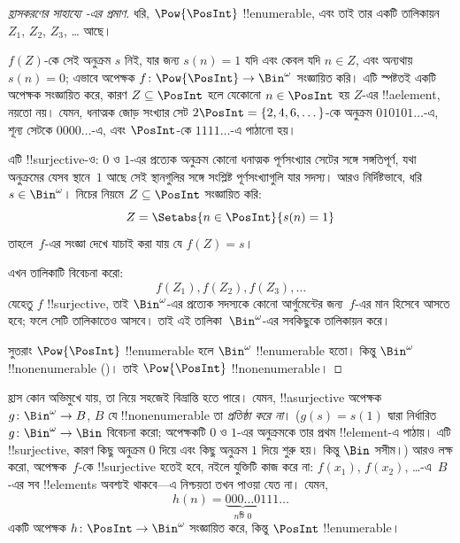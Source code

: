\documentclass[../../../include/open-logic-section]{subfiles}
\begin{document}
\begin{proof}[হ্রাসকরণের সাহায্যে {}-এর প্রমাণ]
ধরি, $\Pow{\PosInt}$ !!{enumerable}, এবং তাই তার একটি তালিকায়ন $Z_{1}$, $Z_{2}$, $Z_{3}$, \dots{} আছে।

$f(Z)$-কে সেই অনুক্রম $s$ নিই, যার জন্য $s(n) = 1$ যদি এবং কেবল যদি $n \in Z$, এবং অন্যথায় $s(n) = 0$; এভাবে অপেক্ষক $f \colon \Pow{\PosInt} \to \Bin^\omega$ সংজ্ঞায়িত করি। 
এটি স্পষ্টতই একটি অপেক্ষক সংজ্ঞায়িত করে, কারণ $Z \subseteq \PosInt$ হলে যেকোনো $n \in \PosInt$ হয় $Z$-এর !!a{element}, নয়তো নয়। যেমন, ধনাত্মক জোড় সংখ্যার সেট $2\PosInt = \{2,
4, 6, \dots\}$-কে অনুক্রম $010101\dots$-এ, শূন্য সেটকে $0000\dots$-এ, এবং $\PosInt$-কে $1111\dots$-এ পাঠানো হয়।

এটি !!{surjective}-ও: $0$ ও $1$-এর প্রত্যেক অনুক্রম কোনো ধনাত্মক পূর্ণসংখ্যার সেটের সঙ্গে সঙ্গতিপূর্ণ, যথা অনুক্রমের যেসব স্থানে~$1$ আছে সেই স্থানগুলির সঙ্গে সংশ্লিষ্ট পূর্ণসংখ্যাগুলি যার সদস্য। আরও নির্দিষ্টভাবে, ধরি $s \in \Bin^\omega$। নিচের নিয়মে $Z \subseteq \PosInt$ সংজ্ঞায়িত করি:
\[
Z = \Setabs{n \in \PosInt}{s(n) = 1}
\]
তাহলে~$f$-এর সংজ্ঞা দেখে যাচাই করা যায় যে $f(Z) = s$।

এখন তালিকাটি বিবেচনা করো:
\[
f(Z_1), f(Z_2), f(Z_3), \dots
\]
যেহেতু $f$ !!{surjective}, তাই $\Bin^\omega$-এর প্রত্যেক সদস্যকে কোনো আর্গুমেন্টের জন্য~$f$-এর মান হিসেবে আসতে হবে; ফলে সেটি তালিকাতেও আসবে। তাই এই তালিকা~$\Bin^\omega$-এর সবকিছুকে তালিকায়ন করে।

সুতরাং $\Pow{\PosInt}$ !!{enumerable} হলে $\Bin^\omega$ !!{enumerable} হতো। কিন্তু $\Bin^\omega$ !!{nonenumerable}
()। তাই $\Pow{\PosInt}$ !!{nonenumerable}।
\end{proof}

\begin{explain}
হ্রাস কোন অভিমুখে যায়, তা নিয়ে সহজেই বিভ্রান্তি হতে পারে। যেমন, !!a{surjective} অপেক্ষক $g \colon \Bin^\omega \to B$, $B$ যে !!{nonenumerable} তা \emph{প্রতিষ্ঠা করে না}। ($g(s) = s(1)$ দ্বারা নির্ধারিত $g
\colon \Bin^\omega \to \Bin$ বিবেচনা করো; অপেক্ষকটি $0$ ও $1$-এর অনুক্রমকে তার প্রথম !!{element}-এ পাঠায়। এটি !!{surjective}, কারণ কিছু অনুক্রম $0$ দিয়ে এবং কিছু অনুক্রম $1$ দিয়ে শুরু হয়। কিন্তু $\Bin$ সসীম।) আরও লক্ষ করো, অপেক্ষক~$f$-কে !!{surjective} হতেই হবে, নইলে যুক্তিটি কাজ করে না: $f(x_1)$, $f(x_2)$, \dots{}-এ~$B$-এর সব !!{element}s অবশ্যই থাকবে—এ নিশ্চয়তা তখন পাওয়া যেত না। যেমন,
\[
h(n) = \underbrace{000\dots0}_{\text{$n$টি $0$}}111\dots
\] 
একটি অপেক্ষক $h\colon \PosInt \to
\Bin^\omega$ সংজ্ঞায়িত করে, কিন্তু $\PosInt$ !!{enumerable}।
\end{explain}
\end{document}
